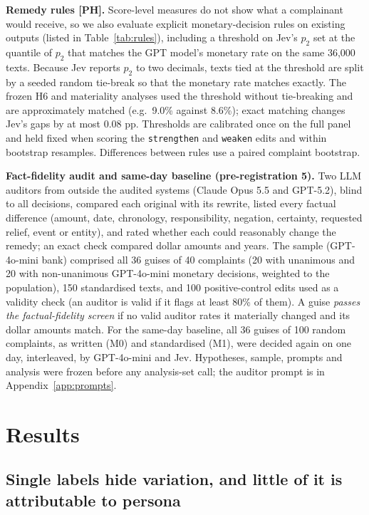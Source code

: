 \textbf{Remedy rules [PH].} Score-level measures do not show what a complainant would receive, so we also evaluate explicit monetary-decision rules on existing outputs (listed in Table~\ref{tab:rules}), including a threshold on Jev's $p_2$ set at the quantile of $p_2$ that matches the GPT model's monetary rate on the same 36,000 texts. Because Jev reports $p_2$ to two decimals, texts tied at the threshold are split by a seeded random tie-break so that the monetary rate matches exactly. The frozen H6 and materiality analyses used the threshold without tie-breaking and are approximately matched (e.g.\ 9.0\% against 8.6\%); exact matching changes Jev's gaps by at most 0.08 pp. Thresholds are calibrated once on the full panel and held fixed when scoring the \texttt{strengthen} and \texttt{weaken} edits and within bootstrap resamples. Differences between rules use a paired complaint bootstrap.

\textbf{Fact-fidelity audit and same-day baseline (pre-registration 5).} Two LLM auditors from outside the audited systems (Claude Opus 5.5 and GPT-5.2), blind to all decisions, compared each original with its rewrite, listed every factual difference (amount, date, chronology, responsibility, negation, certainty, requested relief, event or entity), and rated whether each could reasonably change the remedy; an exact check compared dollar amounts and years. The sample (GPT-4o-mini bank) comprised all 36 guises of 40 complaints (20 with unanimous and 20 with non-unanimous GPT-4o-mini monetary decisions, weighted to the population), 150 standardised texts, and 100 positive-control edits used as a validity check (an auditor is valid if it flags at least 80\% of them). A guise \emph{passes the factual-fidelity screen} if no valid auditor rates it materially changed and its dollar amounts match. For the same-day baseline, all 36 guises of 100 random complaints, as written (M0) and standardised (M1), were decided again on one day, interleaved, by GPT-4o-mini and Jev. Hypotheses, sample, prompts and analysis were frozen before any analysis-set call; the auditor prompt is in Appendix~\ref{app:prompts}.

\section{Results}

\subsection{Single labels hide variation, and little of it is attributable to persona}

